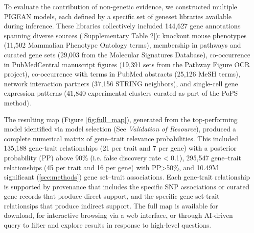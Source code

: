 To evaluate the contribution of non-genetic evidence, we constructed multiple PIGEAN models, each defined by a specific set of geneset libraries available during inference. These libraries collectively included 144,627 gene annotations spanning diverse sources (\ref{Supplementary Table 2}): knockout mouse phenotypes (11,502 Mammalian Phenotype Ontology terms), membership in pathways and curated gene sets (29,003 from the Molecular Signatures Database), co-occurrence in PubMedCentral manuscript figures (19,391 sets from the Pathway Figure OCR project), co-occurrence with terms in PubMed abstracts (25,126 MeSH terms), network interaction partners (37,156 STRING neighbors), and single-cell gene expression patterns (41,840 experimental clusters curated as part of the PoPS method).  

The resulting map (Figure \ref{fig:full_map}), generated from the top-performing model identified via model selection (See \textit{Validation of Resource}), produced a complete numerical matrix of gene–trait relevance probabilities. This included 135,188 gene-trait relationships (21 per trait and 7 per gene) with a posterior probability (PP) above 90\% (i.e. false discovery rate < 0.1), 295,547 gene–trait relationships (45 per trait and 16 per gene) with PP>50\%, and 10.49M significant (\ref{sec:methods}) gene set–trait associations. Each gene-trait relationship is supported by provenance that includes the specific SNP associations or curated gene records  that produce direct support, and the specific gene set-trait relationsips that produce indirect support. The full map is available for download, for interactive browsing via a web interface, or through AI-driven query to filter and explore results in response to high-level questions.  